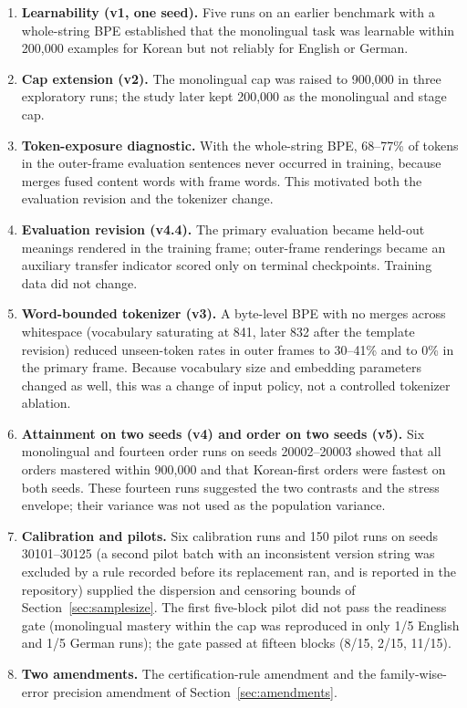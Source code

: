 \documentclass[preprint,12pt,authoryear]{elsarticle}
\begin{document}
\begin{enumerate}
\item \textbf{Learnability (v1, one seed).} Five runs on an earlier benchmark with a whole-string BPE established that the monolingual task was learnable within 200{,}000 examples for Korean but not reliably for English or German.
\item \textbf{Cap extension (v2).} The monolingual cap was raised to 900{,}000 in three exploratory runs; the study later kept 200{,}000 as the monolingual and stage cap.
\item \textbf{Token-exposure diagnostic.} With the whole-string BPE, 68--77\% of tokens in the outer-frame evaluation sentences never occurred in training, because merges fused content words with frame words. This motivated both the evaluation revision and the tokenizer change.
\item \textbf{Evaluation revision (v4.4).} The primary evaluation became held-out meanings rendered in the training frame; outer-frame renderings became an auxiliary transfer indicator scored only on terminal checkpoints. Training data did not change.
\item \textbf{Word-bounded tokenizer (v3).} A byte-level BPE with no merges across whitespace (vocabulary saturating at 841, later 832 after the template revision) reduced unseen-token rates in outer frames to 30--41\% and to 0\% in the primary frame. Because vocabulary size and embedding parameters changed as well, this was a change of input policy, not a controlled tokenizer ablation.
\item \textbf{Attainment on two seeds (v4) and order on two seeds (v5).} Six monolingual and fourteen order runs on seeds 20002--20003 showed that all orders mastered within 900{,}000 and that Korean-first orders were fastest on both seeds. These fourteen runs suggested the two contrasts and the stress envelope; their variance was not used as the population variance.
\item \textbf{Calibration and pilots.} Six calibration runs and 150 pilot runs on seeds 30101--30125 (a second pilot batch with an inconsistent version string was excluded by a rule recorded before its replacement ran, and is reported in the repository) supplied the dispersion and censoring bounds of Section~\ref{sec:samplesize}. The first five-block pilot did not pass the readiness gate (monolingual mastery within the cap was reproduced in only 1/5 English and 1/5 German runs); the gate passed at fifteen blocks (8/15, 2/15, 11/15).
\item \textbf{Two amendments.} The certification-rule amendment and the family-wise-error precision amendment of Section~\ref{sec:amendments}.
\end{enumerate}
\end{document}

